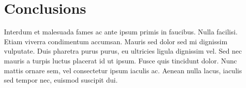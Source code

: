 \documentclass{acm_proc_article-sp}
\begin{document}
\section{Conclusions}

Interdum et malesuada fames ac ante ipsum primis in faucibus. Nulla facilisi.
Etiam viverra condimentum accumsan. Mauris sed dolor sed mi dignissim
vulputate. Duis \cite{clark:pct} pharetra purus purus, eu ultricies ligula dignissim vel. Sed
nec mauris a turpis luctus placerat id ut ipsum. Fusce quis tincidunt dolor.
Nunc mattis ornare sem, vel consectetur ipsum iaculis ac. Aenean nulla lacus,
iaculis sed tempor nec, euismod suscipit dui.




\end{document}
